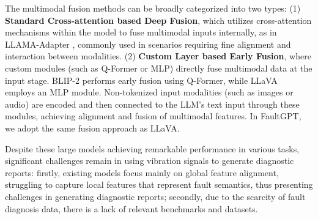 The multimodal fusion methods can be broadly categorized into two types: (1) \textbf{Standard Cross-attention based Deep Fusion}, which utilizes cross-attention mechanisms within the model to fuse multimodal inputs internally, as in LLAMA-Adapter \cite{gao2023llama}, commonly used in scenarios requiring fine alignment and interaction between modalities. (2) \textbf{Custom Layer based Early Fusion}, where custom modules (such as Q-Former or MLP) directly fuse multimodal data at the input stage. BLIP-2 \cite{li2023blip} performs early fusion using Q-Former, while LLaVA~\cite{liu2024visual} employs an MLP module. Non-tokenized input modalities (such as images or audio) are encoded and then connected to the LLM's text input through these modules, achieving alignment and fusion of multimodal features. In FaultGPT, we adopt the same fusion approach as LLaVA.

Despite these large models achieving remarkable performance in various tasks, significant challenges remain in using vibration signals to generate diagnostic reports: firstly, existing models focus mainly on global feature alignment, struggling to capture local features that represent fault semantics, thus presenting challenges in generating diagnostic reports; secondly, due to the scarcity of fault diagnosis data, there is a lack of relevant benchmarks and datasets.